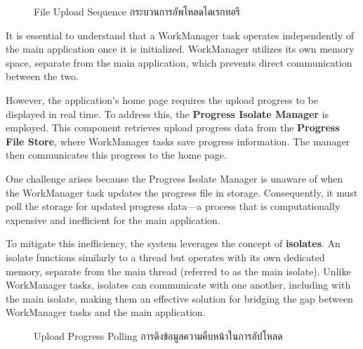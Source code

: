 \begin{figure}[h]
    \begin{center}
    
    \end{center}
    \newcommand{\DirectoryUploadSequence}{\ifenglish File Upload Sequence \else กระบวนการอัพโหลดไดเรกทอรี  \fi}
    \caption[\DirectoryUploadSequence]{\DirectoryUploadSequence}
    \label{fig directory upload quence}
\end{figure}


It is essential to understand that a WorkManager task operates independently of the main application once it is initialized. WorkManager utilizes its own memory space, separate from the main application, which prevents direct communication between the two.

However, the application's home page requires the upload progress to be displayed in real time. To address this, the \textbf{Progress Isolate Manager} is employed. This component retrieves upload progress data from the \textbf{Progress File Store}, where WorkManager tasks save progress information. The manager then communicates this progress to the home page.

One challenge arises because the Progress Isolate Manager is unaware of when the WorkManager task updates the progress file in storage. Consequently, it must poll the storage for updated progress data—a process that is computationally expensive and inefficient for the main application.

To mitigate this inefficiency, the system leverages the concept of \textbf{isolates}. An isolate functions similarly to a thread but operates with its own dedicated memory, separate from the main thread (referred to as the main isolate). Unlike WorkManager tasks, isolates can communicate with one another, including with the main isolate, making them an effective solution for bridging the gap between WorkManager tasks and the main application.


\begin{figure}[h]
    \begin{center}
    
    \end{center}
    \newcommand{\UploadProgressPolling}{\ifenglish Upload Progress Polling \else การดึงข้อมูลความคืบหน้าในการอัปโหลด \fi}
    \caption[\UploadProgressPolling]{\UploadProgressPolling}
    \label{fig upload progress polling}
\end{figure}


